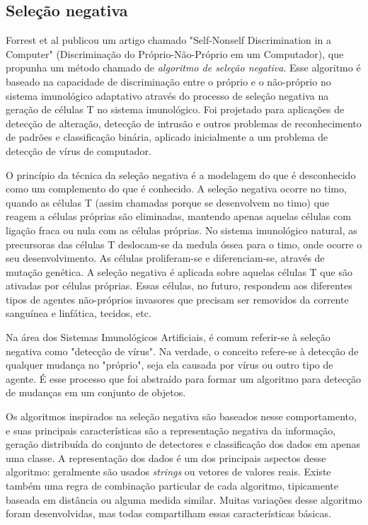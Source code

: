\subsection{Seleção negativa}

Forrest et al \cite{Forrest1994} publicou um artigo chamado "Self-Nonself Discrimination in a Computer" (Discriminação do Próprio-Não-Próprio em um Computador), que propunha um método chamado de \emph{algoritmo de seleção negativa}. Esse algoritmo é baseado na capacidade de discriminação entre o próprio e o não-próprio no sistema imunológico adaptativo através do processo de seleção negativa na geração de células T no sistema imunológico. Foi projetado para aplicações de detecção de alteração, detecção de intrusão e outros problemas de reconhecimento de padrões e classificação binária, aplicado inicialmente a um problema de detecção de vírus de computador.

O princípio da técnica da seleção negativa é a modelagem do que é desconhecido como um complemento do que é conhecido. A seleção negativa ocorre no timo, quando as células T (assim chamadas porque se desenvolvem no timo) que reagem a células próprias são eliminadas, mantendo apenas aquelas células com ligação fraca ou nula com as células próprias. No sistema imunológico natural, as precursoras das células T deslocam-se da medula óssea para o timo, onde ocorre o seu desenvolvimento. As células proliferam-se e diferenciam-se, através de mutação genética. A seleção negativa é aplicada sobre aquelas células T que são ativadas por células próprias. Essas células, no futuro, respondem aos diferentes tipos de agentes não-próprios invasores que precisam ser removidos da corrente sanguínea e linfática, tecidos, etc.

Na área dos Sistemas Imunológicos Artificiais, é comum referir-se à seleção negativa como "detecção de vírus". Na verdade, o conceito refere-se à detecção de qualquer mudança no "próprio", seja ela causada por vírus ou outro tipo de agente. É esse processo que foi abstraído para formar um algoritmo para detecção de mudanças em um conjunto de objetos.

Os algoritmos inspirados na seleção negativa são baseados nesse comportamento, e suas principais características são a representação negativa da informação, geração distribuída do conjunto de detectores e classificação dos dados em apenas uma classe. A representação dos dados é um dos principais aspectos desse algoritmo: geralmente são usados \emph{strings} ou vetores de valores reais. Existe também uma regra de combinação particular de cada algoritmo, tipicamente baseada em distância ou alguma medida similar. Muitas variações desse algoritmo foram desenvolvidas, mas todas compartilham essas características básicas.

